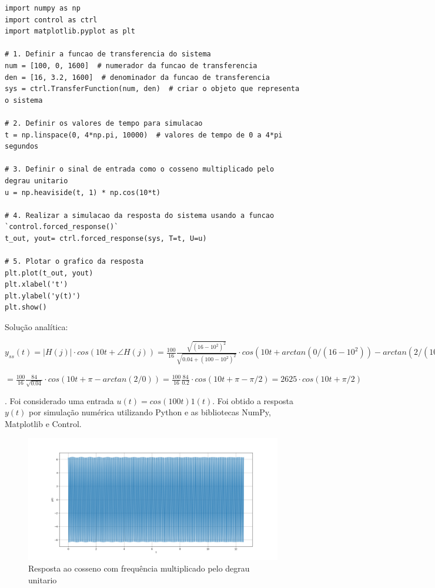 \documentclass[10pt]{article}
\begin{document}
\begin{lstlisting}
import numpy as np
import control as ctrl
import matplotlib.pyplot as plt

# 1. Definir a funcao de transferencia do sistema
num = [100, 0, 1600]  # numerador da funcao de transferencia
den = [16, 3.2, 1600]  # denominador da funcao de transferencia
sys = ctrl.TransferFunction(num, den)  # criar o objeto que representa o sistema

# 2. Definir os valores de tempo para simulacao
t = np.linspace(0, 4*np.pi, 10000)  # valores de tempo de 0 a 4*pi segundos

# 3. Definir o sinal de entrada como o cosseno multiplicado pelo degrau unitario
u = np.heaviside(t, 1) * np.cos(10*t)

# 4. Realizar a simulacao da resposta do sistema usando a funcao `control.forced_response()`
t_out, yout= ctrl.forced_response(sys, T=t, U=u)

# 5. Plotar o grafico da resposta
plt.plot(t_out, yout)
plt.xlabel('t')
plt.ylabel('y(t)')
plt.show()
\end{lstlisting}

\quad Solução analítica:

$y_{ss}(t) = |H(j)| \cdot cos(10 t + \angle H(j)) = \frac{100}{16} \frac{\sqrt{(16-10^2)^2}}{\sqrt{0.04 + (100 - 10^2)^2}} \cdot cos(10 t + arctan(0/(16 - 10^2)) - arctan(2/(100 - 10^2))) =$

$= \frac{100}{16} \frac{84}{\sqrt{0.04}} \cdot cos(10 t + \pi - arctan(2/0)) = \frac{100}{16} \frac{84}{0.2} \cdot cos(10 t + \pi - \pi/2) = 2625 \cdot cos(10 t + \pi/2)$

\newpage

. Foi considerado uma entrada $u(t) = cos(100 t) 1(t)$. Foi obtido a resposta $y(t)$ por simulação numérica utilizando Python
e as bibliotecas NumPy, Matplotlib e Control.

\begin{figure}[h]
    \centering
    \includegraphics[scale=0.45]{questao4.png}
    \caption{Resposta ao cosseno com frequência multiplicado pelo degrau unitario}
\end{figure}
\end{document}
